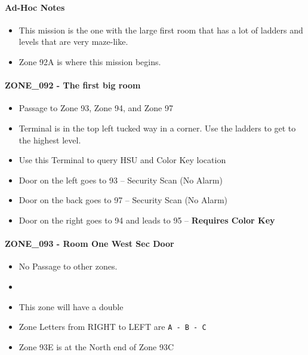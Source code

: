 \pagebreak
\paragraph{Ad-Hoc Notes}
\begin{itemize}
    \item This mission is the one with the large first room that has a lot of ladders and levels that are very maze-like.
    \item Zone 92A is where this mission begins.
\end{itemize}

\paragraph{ZONE\_092 - The first big room}
\begin{itemize}
    \item {\color{Blue}Passage to Zone 93, Zone 94, and Zone 97}
    \item Terminal is in the top left tucked way in a corner.  Use the ladders to get to the highest level.
    \item Use this Terminal to query HSU and Color Key location
    \item Door on the left goes to 93 -- Security Scan (No Alarm)
    \item Door on the back goes to 97 -- Security Scan (No Alarm)
    \item Door on the right goes to 94 and leads to 95 -- \textbf{Requires Color Key}
\end{itemize}

\paragraph{ZONE\_093 - Room One West Sec Door}
\begin{itemize}
    \item {\color{Red}No Passage to other zones.}
    \item {}%
    \item This zone will have a double \gtfoenemyscout{}
    \item Zone Letters from RIGHT to LEFT are \texttt{A - B - C}
    \item Zone 93E is at the North end of Zone 93C
\end{itemize}

